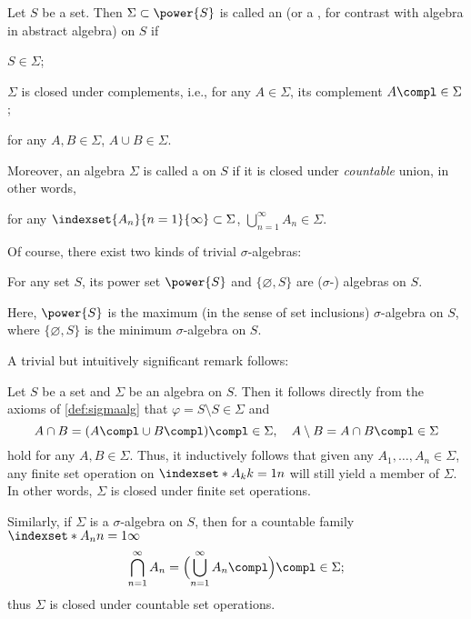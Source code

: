 \begin{definition}
    \label{def:sigmaalg}
    Let \(S\) be a set.
    Then \(\Sigma\subset\power{S}\) is called
    an 
    (or a ,
    for contrast with algebra in abstract algebra)
    on \(S\) if
    \begin{axioms}
        \item \(S\in\Sigma\);
        \item \(\Sigma\) is closed under complements,
        i.e., for any \(A\in\Sigma\),
        its complement \(A\compl\in\Sigma\);
        \item for any \(A,B\in\Sigma\), \(A\cup B\in\Sigma\).
    \end{axioms}
    Moreover, an algebra \(\Sigma\) is called
    a  on \(S\)
    if it is closed under \emph{countable} union,
    in other words,
    \begin{axioms}
        \setcounter{enumi}{3}
        \item for any \(\indexset{A_n}{n=1}{\infty}\subset\Sigma\),
        \(\bigcup_{n=1}^\infty A_n\in\Sigma\).
    \end{axioms}
\end{definition}

Of course, there exist two kinds of trivial \(\sigma\)-algebras:
\begin{example}
    \label{exm:trivialsigma}
    For any set \(S\),
    its power set \(\power{S}\)
    and \(\{\varnothing,S\}\) are (\(\sigma\)-) algebras on \(S\).
\end{example}
Here, \(\power{S}\) is the maximum (in the sense of set inclusions)
\(\sigma\)-algebra on \(S\),
where \(\{\varnothing,S\}\) is the minimum \(\sigma\)-algebra on \(S\).

A trivial but intuitively significant remark follows:
\begin{remark}
    \label{rem:sigmaalg}
    Let \(S\) be a set and \(\Sigma\) be an algebra on \(S\).
    Then it follows directly from the axioms of \cref{def:sigmaalg} that
    \(\varphi=S\setminus S\in\Sigma\)
    and
    \[
        A\cap B
        =(A\compl\cup B\compl)\compl
        \in\Sigma,
        \quad
        A\setminus B
        =A\cap B\compl
        \in\Sigma
    \]
    hold for any \(A,B\in\Sigma\).
    Thus, it inductively follows that
    given any \(A_1,\dots,A_n\in\Sigma\),
    any finite set operation on \(\indexset*{A_k}{k=1}{n}\)
    will still yield a member of \(\Sigma\).
    In other words,
    \(\Sigma\) is closed under finite set operations.
    
    Similarly, if \(\Sigma\) is a \(\sigma\)-algebra on \(S\),
    then for a countable family \(\indexset*{A_n}{n=1}{\infty}\)
    \[
        \bigcap_{n=1}^\infty A_n
        =\Bigl(\bigcup_{n=1}^\infty A_n\compl\Bigr)\compl
        \in\Sigma;
    \]
    thus \(\Sigma\) is closed under countable set operations.
\end{remark}

